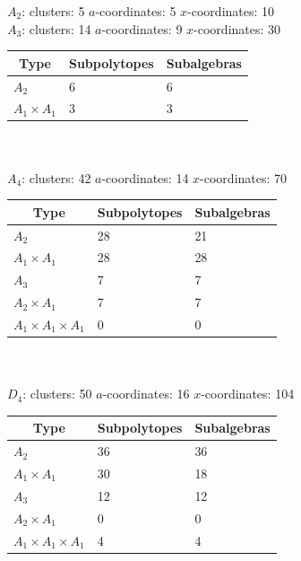 \documentclass[11pt]{article}
\begin{document}
{\Large\underline{\(A_2\)}:} \quad clusters: 5 \qquad $a$-coordinates: 5 \qquad $x$-coordinates: 10 \\


{\Large\underline{\(A_3\)}:} \quad clusters: 14 \qquad \(a\)-coordinates: 9 \qquad \(x\)-coordinates: 30 \\

\begin{tabular}{ | l | l | l |}
\multicolumn{1}{c}{Type} &  \multicolumn{1}{c}{Subpolytopes}  &  \multicolumn{1}{c}{Subalgebras} \\
\hline \(A_2\) & 6 & 6 \\ 
\hline \(A_1 \times A_1\) & 3 & 3 \\ 
\hline
\end{tabular} \\ \\


{\Large \underline{\(A_4\)}:} \quad clusters: 42 \qquad \(a\)-coordinates: 14 \qquad \(x\)-coordinates: 70\\ 

\begin{tabular}{ | l | l | l |}
\multicolumn{1}{c}{Type} &  \multicolumn{1}{c}{Subpolytopes}  &  \multicolumn{1}{c}{Subalgebras} \\
\hline \(A_2\) & 28 & 21 \\ 
\hline \(A_1 \times A_1\) & 28 & 28 \\ \hline 
\hline \(A_3\) & 7 & 7 \\ 
\hline \(A_2 \times A_1\) & 7 & 7 \\ 
\hline \(A_1 \times A_1 \times A_1\) & 0 & 0 \\ 
\hline
\end{tabular} \\ \\ 

{\Large\underline{\(D_4\)}:} \quad clusters: 50 \qquad \(a\)-coordinates: 16 \qquad \(x\)-coordinates: 104\\

\begin{tabular}{ | l | l | l |}
\multicolumn{1}{c}{Type} &  \multicolumn{1}{c}{Subpolytopes}  &  \multicolumn{1}{c}{Subalgebras} \\
\hline \(A_2\) & 36 & 36 \\ 
\hline \(A_1 \times A_1\) & 30 & 18 \\ \hline 
\hline \(A_3\) & 12 & 12 \\ 
\hline \(A_2 \times A_1\) & 0 & 0 \\ 
\hline \(A_1 \times A_1 \times A_1\) & 4 & 4 \\ 
\hline
\end{tabular} \\ \\
\end{document}
